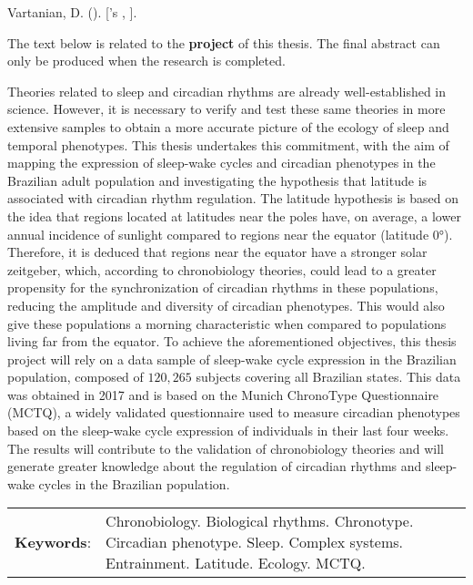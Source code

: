 \begin{resumoenv}[\resumoname]
Vartanian, D. ({\imprimirdata}). \textit{\imprimirtitulo} [{\imprimirtipodetituloacademico}'s {\imprimirtipotrabalho}, {\imprimiruniversidade}].


The text below is related to the \textbf{project} of this thesis. The
final abstract can only be produced when the research is completed.

Theories related to sleep and circadian rhythms are already
well-established in science. However, it is necessary to verify and test
these same theories in more extensive samples to obtain a more accurate
picture of the ecology of sleep and temporal phenotypes. This thesis
undertakes this commitment, with the aim of mapping the expression of
sleep-wake cycles and circadian phenotypes in the Brazilian adult
population and investigating the hypothesis that latitude is associated
with circadian rhythm regulation. The latitude hypothesis is based on
the idea that regions located at latitudes near the poles have, on
average, a lower annual incidence of sunlight compared to regions near
the equator (latitude 0°). Therefore, it is deduced that regions near
the equator have a stronger solar zeitgeber, which, according to
chronobiology theories, could lead to a greater propensity for the
synchronization of circadian rhythms in these populations, reducing the
amplitude and diversity of circadian phenotypes. This would also give
these populations a morning characteristic when compared to populations
living far from the equator. To achieve the aforementioned objectives,
this thesis project will rely on a data sample of sleep-wake cycle
expression in the Brazilian population, composed of \(120,265\) subjects
covering all Brazilian states. This data was obtained in 2017 and is
based on the Munich ChronoType Questionnaire (MCTQ), a widely validated
questionnaire used to measure circadian phenotypes based on the
sleep-wake cycle expression of individuals in their last four weeks. The
results will contribute to the validation of chronobiology theories and
will generate greater knowledge about the regulation of circadian
rhythms and sleep-wake cycles in the Brazilian population.


\begin{tabular}{p{2.3cm} p{13.6cm}}
  \textbf{Keywords}: & Chronobiology. Biological rhythms. Chronotype. Circadian phenotype. Sleep. Complex systems. Entrainment. Latitude. Ecology. MCTQ.
\end{tabular}
\end{resumoenv}


